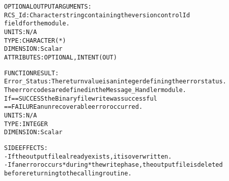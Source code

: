 \begin{alltt}
  OPTIONAL OUTPUT ARGUMENTS:
        RCS_Id:       Character string containing the version control Id
                      field for the module.
                      UNITS:      N/A
                      TYPE:       CHARACTER(*)
                      DIMENSION:  Scalar
                      ATTRIBUTES: OPTIONAL, INTENT(OUT)
 
  FUNCTION RESULT:
        Error_Status: The return value is an integer defining the error status.
                      The error codes are defined in the Message_Handler module.
                      If == SUCCESS the Binary file write was successful
                         == FAILURE an unrecoverable error occurred.
                      UNITS:      N/A
                      TYPE:       INTEGER
                      DIMENSION:  Scalar
 
  SIDE EFFECTS:
        - If the output file already exists, it is overwritten.
        - If an error occurs *during* the write phase, the output file is deleted
          before returning to the calling routine.
 
  \end{alltt}
